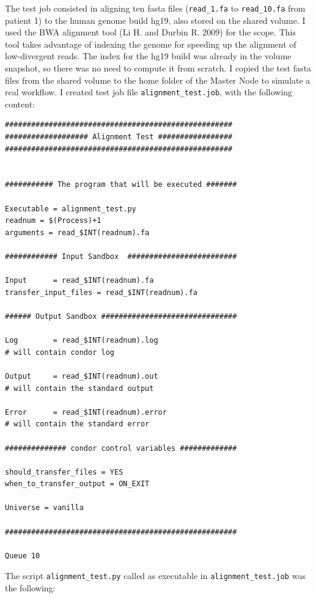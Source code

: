 \documentclass{article}
\begin{document}
The test job consisted in aligning ten fasta files (\texttt{read\_1.fa} to \texttt{read\_10.fa} from patient 1) to the human genome build hg19, also stored on the shared volume.
I used the BWA alignment tool (Li H. and Durbin R. 2009) for the scope.
This tool takes advantage of indexing the genome for speeding up the alignment of low-divergent reads.
The index for the hg19 build was already in the volume snapshot, so there was no need to compute it from scratch.
I copied the test fasta files from the shared volume to the home folder of the Master Node to simulate a real workflow.
I created test job file \texttt{alignment\_test.job}, with the following content:

\begin{lstlisting}
####################################################
################### Alignment Test #################
####################################################


########### The program that will be executed #######

Executable = alignment_test.py
readnum = $(Process)+1
arguments = read_$INT(readnum).fa

############ Input Sandbox  #########################

Input      = read_$INT(readnum).fa
transfer_input_files = read_$INT(readnum).fa

###### Output Sandbox ###############################

Log        = read_$INT(readnum).log
# will contain condor log

Output     = read_$INT(readnum).out
# will contain the standard output

Error      = read_$INT(readnum).error
# will contain the standard error

############## condor control variables #############

should_transfer_files = YES
when_to_transfer_output = ON_EXIT

Universe = vanilla

#####################################################

Queue 10
\end{lstlisting}

The script \texttt{alignment\_test.py} called as executable in \texttt{alignment\_test.job} was the following:
\end{document}
